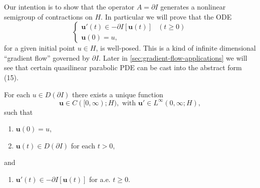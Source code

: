 Our intention is to show that the operator $A = \partial I$ generates a nonlinear semigroup of contractions on $H$. In particular we will prove that the ODE
\[
\begin{cases} \mathbf{u}'(t) \in -\partial I[\mathbf{u}(t)] & (t \geq 0) \\ \mathbf{u}(0) = u, \end{cases}
\tag{15}
\]
for a given initial point $u \in H$, is well-posed. This is a kind of infinite dimensional ``gradient flow'' governed by $\partial I$. Later in \cref{sec:gradient-flow-applications} we will see that certain quasilinear parabolic PDE can be cast into the abstract form (15).

\begin{theorem}
\label{thm:solution-of-gradient-flow}
For each $u \in D(\partial I)$ there exists a unique function
\[
\mathbf{u} \in C([0, \infty); H), \text{ with } \mathbf{u}' \in L^\infty(0, \infty; H),
\tag{16}
\]
such that
\begin{enumerate}
\item[(i)] $\mathbf{u}(0) = u$,
\item[(ii)] $\mathbf{u}(t) \in D(\partial I)$ for each $t > 0$,
\end{enumerate}
and
\begin{enumerate}
\item[(iii)] $\mathbf{u}'(t) \in -\partial I[\mathbf{u}(t)]$ for a.e. $t \geq 0$.
\end{enumerate}
\end{theorem}
